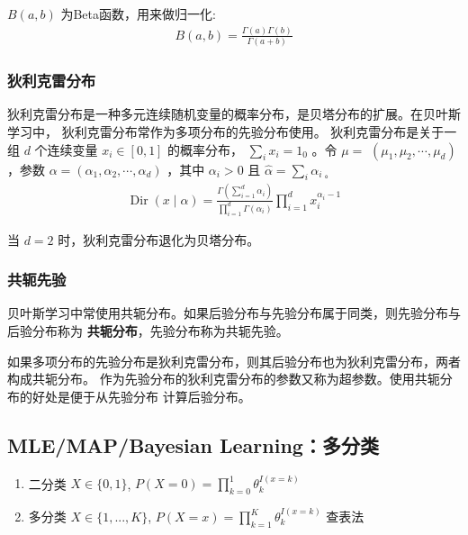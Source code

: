 \documentclass[UTF8]{ctexart}
\numberwithin{equation}{section}
\begin{document}
$B(a, b)$ 为Beta函数，用来做归一化:
$$
\begin{aligned}
B(a, b)=\frac{\Gamma(a) \Gamma(b)}{\Gamma(a+b)}
\end{aligned}
$$


\subsubsection{狄利克雷分布}
狄利克雷分布是一种多元连续随机变量的概率分布，是贝塔分布的扩展。在贝叶斯学习中，
狄利克雷分布常作为多项分布的先验分布使用。
狄利克雷分布是关于一组 $d$ 个连续变量 $x_{i} \in[0,1]$ 的概率分布， $\sum_{i} x_{i}=1_{0}$ 。令 $\mu=$ $\left(\mu_{1}, \mu_{2}, \cdots, \mu_{d}\right)$ ，参数 $\alpha=\left(\alpha_{1}, \alpha_{2}, \cdots, \alpha_{d}\right)$ ，其中 $\alpha_{i}>0$ 且 $\hat{\alpha}=\sum_{i} \alpha_{i \text { 。 }}$
$$
\begin{aligned}
\operatorname{Dir}(x \mid \alpha)=\frac{\Gamma(\sum^{d}_{i=1}\alpha_i)}{\prod_{i=1}^{d}\Gamma(\alpha_i)}  \prod_{i=1}^{d}x_{i}^{\alpha_{i}-1}
\end{aligned}
$$

当 $d=2$ 时，狄利克雷分布退化为贝塔分布。


\subsubsection{共轭先验}
贝叶斯学习中常使用共轭分布。如果后验分布与先验分布属于同类，则先验分布与后验分布称为
\textbf{共轭分布}，先验分布称为共轭先验。

如果多项分布的先验分布是狄利克雷分布，则其后验分布也为狄利克雷分布，两者构成共轭分布。
作为先验分布的狄利克雷分布的参数又称为超参数。使用共轭分布的好处是便于从先验分布
计算后验分布。

\subsection{MLE/MAP/Bayesian Learning：多分类}


\begin{enumerate}
    \item 二分类 $X\in\{0,1\}$, $P(X=0)=\prod^{1}_{k=0}\theta_k^{I(x=k)}$
    \item 多分类 $X\in\{1,...,K\}$, $P(X=x)=\prod^{K}_{k=1}\theta_k^{I(x=k)}$ 查表法
\end{enumerate}
\end{document}
